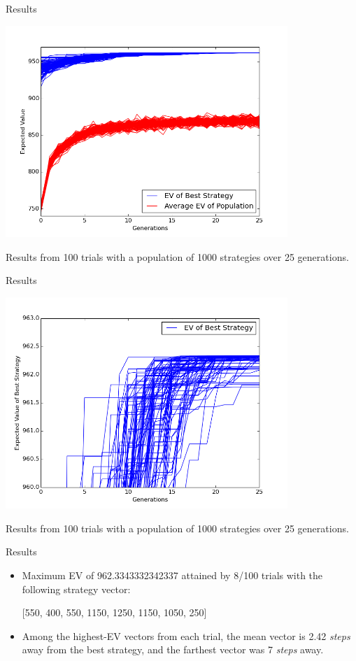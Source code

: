 \documentclass{beamer}
\begin{document}
  \begin{frame}{Results}
  \begin{center}
  \includegraphics[width = 0.8\textwidth]{100trials.png}
  \end{center}

    Results from 100 trials with a population of 1000 strategies over 25 generations.
  \end{frame}

  \begin{frame}{Results}
  \begin{center}
  \includegraphics[width = 0.8\textwidth]{100trials2.png}
  \end{center}
  
    Results from 100 trials with a population of 1000 strategies over 25 generations.
  \end{frame}

  \begin{frame}{Results}
  \begin{itemize}
  	\item Maximum EV of 962.3343332342337 attained by 8/100 trials with the following strategy vector: \\
    \begin{center}
    [550, 400, 550, 1150, 1250, 1150, 1050, 250]
    \end{center}
    \item Among the highest-EV vectors from each trial, the mean vector is 2.42 \textit{steps} away from the best strategy, and the farthest vector was 7 \textit{steps} away.
  \end{itemize}
  \end{frame}
\end{document}
